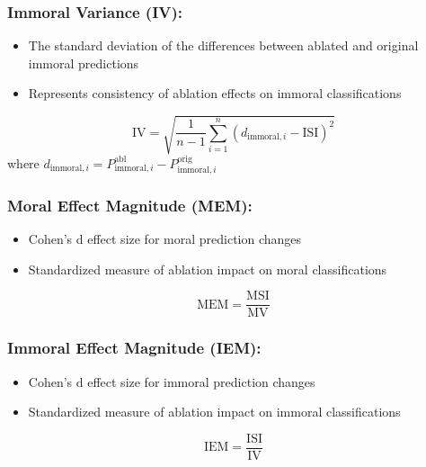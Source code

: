 \documentclass[runninghheads]{llncs}
\begin{document}
\subsubsection{Immoral Variance (IV):}
\begin{itemize}
    \item The standard deviation of the differences between ablated and original immoral predictions
    \item Represents consistency of ablation effects on immoral classifications
\end{itemize}
$$\text{IV} = \sqrt{\frac{1}{n-1}\sum_{i=1}^{n}(d_{\text{immoral},i} - \text{ISI})^2}$$
where $d_{\text{immoral},i} = P^{\text{abl}}_{\text{immoral},i} - P^{\text{orig}}_{\text{immoral},i}$

\subsubsection{Moral Effect Magnitude (MEM):}
\begin{itemize}
    \item Cohen's d effect size for moral prediction changes
    \item Standardized measure of ablation impact on moral classifications
\end{itemize}
$$\text{MEM} = \frac{\text{MSI}}{\text{MV}}$$


\subsubsection{Immoral Effect Magnitude (IEM):}
\begin{itemize}
    \item Cohen's d effect size for immoral prediction changes
    \item Standardized measure of ablation impact on immoral classifications
\end{itemize}
$$\text{IEM} = \frac{\text{ISI}}{\text{IV}}$$
\end{document}
